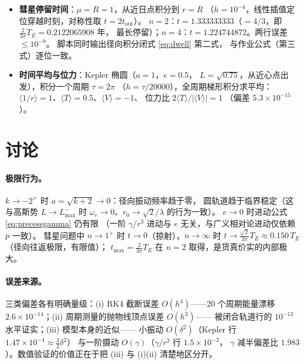 \documentclass[UTF8,a4paper,11pt]{ctexart}
\begin{document}
\begin{itemize}
        一致（$4.5\times10^{-15}$）；临界半径 $r_*=1.41421356237=\sqrt2/\lambda$
        （对边际条件 $V_{\mathrm{eff}}''=0$ 沿圆轨道族直接二分）。
        窗口两侧：$L=0.999\,L_{\max}$ 时稳定支
        $r_0=1.3827$、$V_{\mathrm{eff}}''=+0.0521>0$；
        $L=1.001\,L_{\max}$ 时 $V_{\mathrm{eff}}'$ 在窗口内无零点，圆轨道不存在。
  \item \textbf{彗星停留时间}：$\mu=R=1$，从近日点积分到 $r=R$
        （$h=10^{-4}$，线性插值定位穿越时刻，对称性取 $t=2t_{\mathrm{out}}$）。
        $n=2$：$t=1.333333333$（$=4/3$，即 $\frac{2}{3\pi}T_E=0.2122065908$ 年，
        最长停留）；$n=4$：$t=1.224744872$。两行误差 $\le10^{-9}$。
        脚本同时输出径向积分闭式 \eqref{eq:dwell} 第二式，
        与作业公式（第三式）逐位一致。
  \item \textbf{时间平均与位力}：Kepler 椭圆（$a=1$，$e=0.5$，
        $L=\sqrt{0.75}$，从近心点出发），积分一个周期 $\tau=2\pi$
        （$h=\tau/20000$），全周期梯形积分求平均：
        $\langle1/r\rangle=1$、$\langle T\rangle=0.5$、$\langle V\rangle=-1$、
        位力比 $2\langle T\rangle/|\langle V\rangle|=1$
        （偏差 $5.3\times10^{-15}$）。
\end{itemize}

\section{讨论}
\label{sec:discuss}

\paragraph{极限行为。}
$k\to-2^+$ 时 $a=\sqrt{k+2}\to0$：径向振动频率趋于零，
圆轨道趋于临界稳定（这与高斯势 $L\to L_{\max}^-$ 时
$\omega_r\to0$、$r_0\to\sqrt2/\lambda$ 的行为一致）。
$e\to0$ 时进动公式 \eqref{eq:precessgamma} 仍有限
（一阶 $\gamma/r^3$ 进动与 $e$ 无关，与广义相对论进动仅依赖 $p$ 一致）。
彗星问题中 $n\to1^+$ 时 $t\to0$（掠射），$n\to\infty$ 时
$t\to\frac{\sqrt2}{3\pi}T_E\approx0.150\,T_E$（径向往返极限，有限值）；
$t_{\max}=\frac{2}{3\pi}T_E$ 在 $n=2$ 取得，是货真价实的内部极大。

\paragraph{误差来源。}
三类偏差各有明确量级：(i) RK4 截断误差 $O(h^4)$——20 个周期能量漂移
$2.6\times10^{-14}$；(ii) 周期测量的抛物线顶点误差 $O(h^2)$——
被闭合轨道行的 $10^{-13}$ 水平证实；(iii) 模型本身的近似——
小振动 $O(\delta^2)$（Kepler 行 $1.47\times10^{-4}\approx\frac32\delta^2$）
与一阶摄动 $O(\gamma)$（$\gamma/r^3$ 行 $1.5\times10^{-2}$，
$\gamma$ 减半偏差比 $1.983$）。数值验证的价值正在于把 (iii)
与 (i)(ii) 清楚地区分开。
\end{document}
